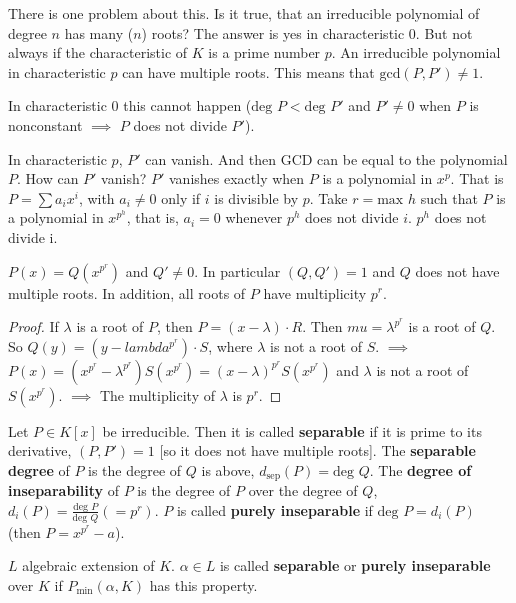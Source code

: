 There is one problem about this. Is it true, that an irreducible polynomial of degree $n$ has many ($n$) roots? The answer is yes in characteristic $0$. But not always if the characteristic of $K$ is a prime number $p$. An irreducible polynomial in characteristic $p$ can have multiple roots. This means that $\text{gcd}(P,P')\neq 1$. 

In characteristic 0 this cannot happen ($\text{deg }P<\text{deg }P'$ and $P'\neq 0$ when $P$ is nonconstant $\implies$ $P$ does not divide $P'$). 

In characteristic $p$, $P'$ can vanish. And then GCD can be equal to the polynomial $P$. How can $P'$ vanish? $P'$ vanishes exactly when $P$ is a polynomial in $x^p$. That is $P =\sum a_i x^i$, with $a_i\neq 0$ only if $i$ is divisible by $p$. Take $r = \text{max } h$ such that $P$ is a polynomial in $x^{p^h}$, that is, $a_i=0$ whenever $p^h$ does not divide $i$. $p^h$ does not divide i.

\begin{proposition}
$P(x)=Q(x^{p^r})$ and $Q'\neq 0$. In particular $(Q,Q')=1$ and $Q$ does not have multiple roots. In addition, all roots of $P$ have multiplicity $p^r$.
\end{proposition}

\begin{proof}
If $\lambda$ is a root of $P$, then $P = (x - \lambda) \cdot R$. Then $mu=\lambda^{p^r}$ is a root of $Q$. So $Q(y) =(y - lambda^{p^r})\cdot S$, where $\lambda$ is not a root of $S$. $\implies$ $P(x)=(x^{p^r}-\lambda^{p^r})S(x^{p^r})=(x-\lambda)^{p^r}S(x^{p^r})$ and $\lambda$ is not a root of $S(x^{p^r})$. $\implies$  The multiplicity of $\lambda$ is $p^r$.
\end{proof}

\begin{definition}
Let $P\in K[x]$ be irreducible. Then it is called \textbf{separable} if it is prime to its derivative, $(P,P')=1$ [so it does not have multiple roots]. The \textbf{separable degree} of $P$ is the degree of $Q$ is above, $d_{\text{sep}}(P)=\text{deg }Q$. The \textbf{degree of inseparability} of $P$ is the degree of $P$ over the degree of $Q$, $d_i(P)=\frac{\text{deg }P}{\text{deg }Q}(=p^r)$. $P$ is called \textbf{purely inseparable} if $\text{deg }P=d_i(P)$ (then $P=x^{p^r} - a$).
\end{definition}

\begin{definition}
$L$ algebraic extension of $K$. $\alpha \in L$ is called \textbf{separable} or \textbf{purely inseparable} over $K$ if $P_{\text{min}}(\alpha,K)$ has this property. 
\end{definition}

